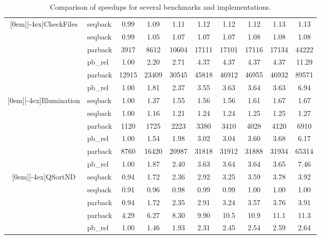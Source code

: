 \documentclass{tlp}
\newcommand{\compressfigure}{\vspace{-1em}}
\begin{document}
\begin{table}[t]
{\begin{tabular}[b]{|c||l||c|c|c|c|c|c|c|c|}
    \raisebox{-4ex}[0em][-4ex]{CheckFiles}
& \textsf{seqback} & 0.99 & 1.09 & 1.11 & 1.12 & 1.12 & 1.12 & 1.13 & 1.13 
    \\\cline{2-10}
& \textsf{seqback}   & 0.99 & 1.05 & 1.07 & 1.07 & 1.07 & 1.08 & 1.08 & 1.08 
    \\\cline{2-10}
    & \textsf{parback}   & 3917 & 8612 & 10604 & 17111 & 17101 & 17116 & 17134 & 44222 
    \\\cline{2-10}
    & \textsf{pb\_rel}   &  1.00 & 2.20 & 2.71 & 4.37 & 4.37 & 4.37 & 4.37 & 11.29    
    \\\cline{2-10}
    & \textsf{parback}     & 12915 & 23409 & 30545 & 45818 & 46912 & 46955 & 46932 & 89571 
    \\\cline{2-10}
    & \textsf{pb\_rel}     & 1.00 & 1.81 & 2.37 & 3.55 & 3.63 & 3.64 & 3.63 & 6.94    
    \\\cline{1-10}

    \raisebox{-4ex}[0em][-4ex]{Illumination}
    & \textsf{seqback}  & 1.00 & 1.37 & 1.55 & 1.56 & 1.56 & 1.61 & 1.67 & 1.67
\\\cline{2-10} 
    & \textsf{seqback}    & 1.00 & 1.16 & 1.21 & 1.24 & 1.24 & 1.25 & 1.25 & 1.27 
\\\cline{2-10} 
    & \textsf{parback}    & 1120 & 1725 & 2223 & 3380 & 3410 & 4028 & 4120 & 6910
    \\\cline{2-10}
    & \textsf{pb\_rel}    & 1.00 & 1.54 & 1.98 & 3.02 & 3.04 & 3.60 & 3.68 & 6.17 
    \\\cline{2-10} 
    & \textsf{parback}      & 8760 & 16420 & 20987 & 31818 & 31912 & 31888 & 31934 & 65314  
    \\\cline{2-10}
    & \textsf{pb\_rel}      & 1.00 & 1.87 & 2.40 & 3.63 & 3.64 & 3.64 & 3.65 & 7.46 
    \\\cline{1-10}

    \raisebox{-4ex}[0em][-4ex]{QSortND}
    & \textsf{seqback}  & 0.94 & 1.72 & 2.36 & 2.92 & 3.25 & 3.59 & 3.78 & 3.92
    \\\cline{2-10} 
    & \textsf{seqback}    & 0.91 & 0.96 & 0.98 & 0.99 & 0.99 & 1.00 & 1.00 & 1.00
    \\\cline{2-10} 
    & \textsf{parback}    & 0.94 & 1.72 & 2.35 & 2.91 & 3.24 & 3.57 & 3.76 & 3.91
    \\\cline{2-10} 
    & \textsf{parback}      & 4.29 & 6.27 & 8.30 & 9.90 & 10.5 & 10.9 & 11.1 & 11.3 
    \\\cline{2-10}
    & \textsf{pb\_rel}      & 1.00 & 1.46 & 1.93 & 2.31 & 2.45 & 2.54 & 2.59 & 2.64 
    \\\cline{1-10}
  \end{tabular}}\hspace*{8em}
  \caption{Comparison of speedups for several benchmarks and implementations.}
  \label{tab:speedup_results}
\compressfigure
\vspace{-1ex}
\end{table}
\end{document}
